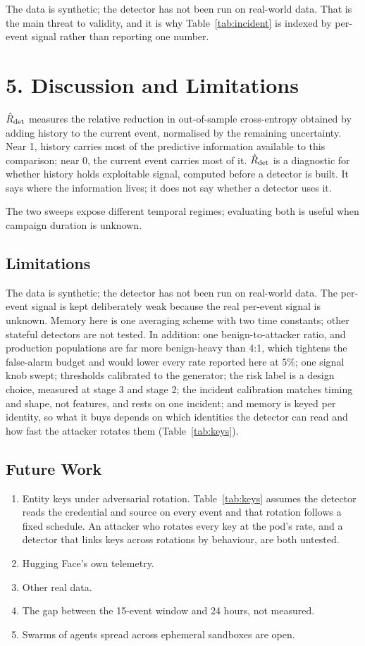 \documentclass[11pt,letterpaper]{article}
\begin{document}
The data is synthetic; the detector has not been run on real-world data. That is the main threat to validity, and it is why Table~\ref{tab:incident} is indexed by per-event signal rather than reporting one number.

\section*{5. Discussion and Limitations}
$\hat R_{\rm det}$ measures the relative reduction in out-of-sample cross-entropy obtained by adding history to the current event, normalised by the remaining uncertainty. Near 1, history carries most of the predictive information available to this comparison; near 0, the current event carries most of it. $\hat R_{\rm det}$ is a diagnostic for whether history holds exploitable signal, computed before a detector is built. It says where the information lives; it does not say whether a detector uses it.

The two sweeps expose different temporal regimes; evaluating both is useful when campaign duration is unknown.

\subsection*{Limitations}
The data is synthetic; the detector has not been run on real-world data. The per-event signal is kept deliberately weak because the real per-event signal is unknown. Memory here is one averaging scheme with two time constants; other stateful detectors are not tested. In addition: one benign-to-attacker ratio, and production populations are far more benign-heavy than 4:1, which tightens the false-alarm budget and would lower every rate reported here at 5\%; one signal knob swept; thresholds calibrated to the generator; the risk label is a design choice, measured at stage 3 and stage 2; the incident calibration matches timing and shape, not features, and rests on one incident; and memory is keyed per identity, so what it buys depends on which identities the detector can read and how fast the attacker rotates them (Table~\ref{tab:keys}).

\subsection*{Future Work}
\begin{enumerate}\item Entity keys under adversarial rotation. Table~\ref{tab:keys} assumes the detector reads the credential and source on every event and that rotation follows a fixed schedule. An attacker who rotates every key at the pod's rate, and a detector that links keys across rotations by behaviour, are both untested. \item Hugging Face's own telemetry. \item Other real data. \item The gap between the 15-event window and 24 hours, not measured. \item Swarms of agents spread across ephemeral sandboxes are open.\end{enumerate}
\end{document}
